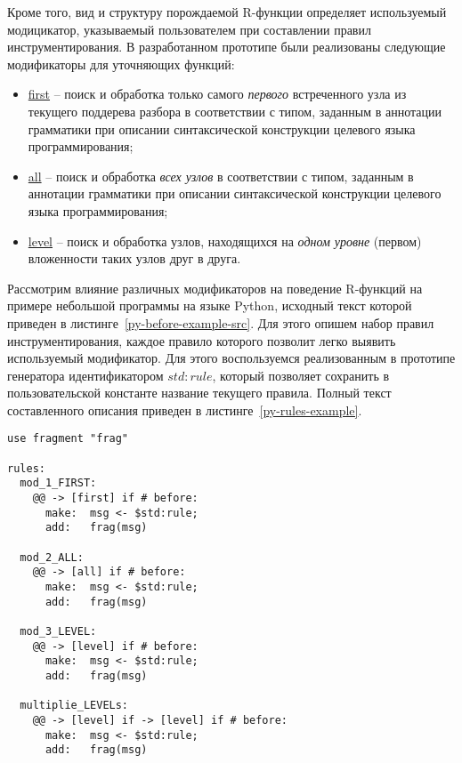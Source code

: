Кроме того, вид и структуру порождаемой R-функции определяет используемый модицикатор, указываемый пользователем при составлении правил инструментирования.
В разработанном прототипе были реализованы следующие модификаторы для уточняющих функций:

\begin{itemize}[noitemsep]
  \item \underline{first} -- поиск и обработка только самого \textit{первого} встреченного узла из текущего поддерева разбора в соответствии с типом, заданным в аннотации грамматики при описании синтаксической конструкции целевого языка программирования;
  \item \underline{all}   -- поиск и обработка \textit{всех узлов} в соответствии с типом, заданным в аннотации грамматики при описании синтаксической конструкции целевого языка программирования;
  \item \underline{level} -- поиск и обработка узлов, находящихся на \textit{одном уровне} (первом) вложенности таких узлов друг в друга.
\end{itemize}

Рассмотрим влияние различных модификаторов на поведение R-функций на примере небольшой программы на языке Python, исходный текст которой приведен в листинге~\ref{py-before-example-src}.
Для этого опишем набор правил инструментирования, каждое правило которого позволит легко выявить используемый модификатор.
Для этого воспользуемся реализованным в прототипе генератора идентификатором $std:rule$, который позволяет сохранить в пользовательской константе название текущего правила.
Полный текст составленного описания приведен в листинге~\ref{py-rules-example}.

\begin{lstlisting}[frame=single, label={py-rules-example}, caption={Применение различных модификаторов уточняющих функций в описании правил (форматирование изменено для компактности).}]
use fragment "frag"

rules:
  mod_1_FIRST:
    @@ -> [first] if # before:
      make:  msg <- $std:rule;
      add:   frag(msg)

  mod_2_ALL:
    @@ -> [all] if # before:
      make:  msg <- $std:rule;
      add:   frag(msg)

  mod_3_LEVEL:
    @@ -> [level] if # before:
      make:  msg <- $std:rule;
      add:   frag(msg)

  multiplie_LEVELs:
    @@ -> [level] if -> [level] if # before:
      make:  msg <- $std:rule;
      add:   frag(msg)
\end{lstlisting}

